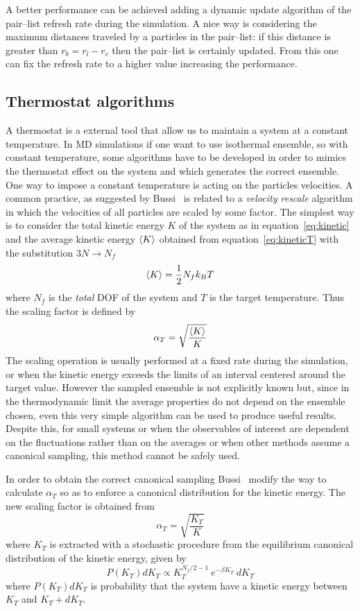 A better performance can be achieved adding a dynamic update algorithm of the pair--list refresh rate during the simulation. A nice way is considering the maximum distances traveled by a particles in the pair--list: if this distance is greater than $r_b = r_l - r_c$ then the pair--list is certainly updated. From this one can fix the refresh rate to a higher value increasing the performance.

\subsection{Thermostat algorithms} %
A thermostat is a external tool that allow us to maintain a system at a constant temperature. In \ac{MD} simulations if one want to use isothermal ensemble, so with constant temperature, some algorithms have to be developed in order to mimics the thermostat effect on the system and which generates the correct ensemble. One way to impose a constant temperature is acting on the particles velocities. A common practice, as suggested by Bussi \etal\, \cite{Bussi} is related to a \textit{velocity rescale} algorithm in which the velocities of all particles are scaled by some factor. The simplest way is to consider the total kinetic energy $K$ of the system as in equation~\eqref{eq:kinetic} and the average kinetic energy $\langle K \rangle$ obtained from equation~\eqref{eq:kineticT} with the substitution $3N\rightarrow N_f$
\begin{equation*}
	\langle K \rangle = \frac{1}{2}N_f k_B T
\end{equation*}
where $N_f$ is the \textit{total} \ac{DOF} of the system and $T$ is the target temperature. Thus the scaling factor is defined by
\begin{equation*}
	\alpha_{T} = \sqrt{\frac{\langle K \rangle}{K}}
\end{equation*}
The scaling operation is usually performed at a fixed rate during the simulation, or when the kinetic energy exceeds the limits of an interval centered around the target value. However the sampled ensemble is not explicitly known but, since in the thermodynamic limit the average properties do not depend on the ensemble chosen, even this very simple algorithm can be used to produce useful results. Despite this, for small systems or when the observables of interest are dependent on the fluctuations rather than on the averages or when other methods assume a canonical sampling, this method cannot be safely used.

In order to obtain the correct canonical sampling Bussi \etal\, modify the way to calculate $\alpha_T$ so as to enforce a canonical distribution for the kinetic energy. The new scaling factor is obtained from
\begin{equation*}
	\alpha_{T} = \sqrt{\frac{K_T}{K}}
\end{equation*}
where $K_T$ is extracted with a stochastic procedure from the equilibrium canonical distribution of the kinetic energy, given by
\begin{equation*}
	P(K_T)dK_T \propto K_T^{N_f/2-1}\ e^{-\beta K_T}\ dK_T
\end{equation*}
where $P(K_T)dK_T$ is probability that the system have a kinetic energy between $K_T$ and $K_T + dK_T$.

